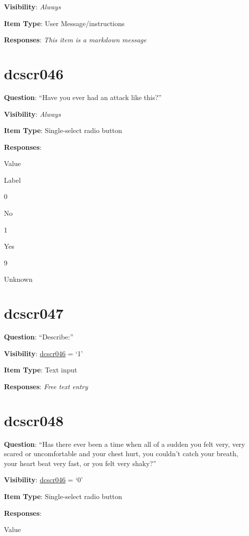 \documentclass[]{book}
\begin{document}
\textbf{Visibility}: \emph{Always}

\textbf{Item Type}: User Message/instructions

\textbf{Responses}: \emph{This item is a markdown message}

\hypertarget{dcscr046}{%
\section{dcscr046}\label{dcscr046}}

\textbf{Question}: ``Have you ever had an attack like this?''

\textbf{Visibility}: \emph{Always}

\textbf{Item Type}: Single-select radio button

\textbf{Responses}:

Value

Label

0

No

1

Yes

9

Unknown

\hypertarget{dcscr047}{%
\section{dcscr047}\label{dcscr047}}

\textbf{Question}: ``Describe:''

\textbf{Visibility}: \protect\hyperlink{dcscr046}{dcscr046} = `1'

\textbf{Item Type}: Text input

\textbf{Responses}: \emph{Free text entry}

\hypertarget{dcscr048}{%
\section{dcscr048}\label{dcscr048}}

\textbf{Question}: ``Has there ever been a time when all of a sudden you felt very, very scared or uncomfortable and your chest hurt, you couldn't catch your breath, your heart beat very fast, or you felt very shaky?''

\textbf{Visibility}: \protect\hyperlink{dcscr046}{dcscr046} = `0'

\textbf{Item Type}: Single-select radio button

\textbf{Responses}:

Value
\end{document}
